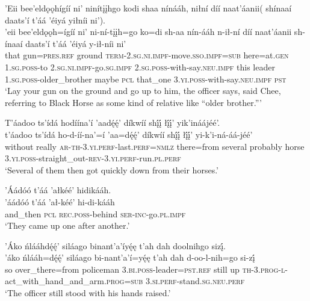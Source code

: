 \ea\label{ex:text1-66-18}
’Eii bee’eldǫǫhígíí ni’ ninítįįhgo kodi shaa nínááh, niłní díí naat’áanii( shínaaí daats’í t’áá ’éiyá yiłníi ni’).\\
\gll ’eii	bee’eldǫǫh=ígíí	ni’	ni-ní-tįįh=go	ko=di	sh-aa	nín-ááh	n-ił-ní	díí	naat’áanii	sh-ínaaí	daats’í	t’áá ’éiyá	y-ił-níi	ni’\\
     that	gun=\textsc{pres}.\textsc{ref}	ground	\textsc{term}-2.\textsc{sg}.\textsc{ni}.\textsc{impf}-move.\textsc{sso}.\textsc{impf}=\textsc{sub}	here=at.\textsc{gen}	1.\textsc{sg}.\textsc{poss}-to	2.\textsc{sg}.\textsc{ni}.\textsc{impf}-go.\textsc{sg}.\textsc{impf}	2.\textsc{sg}.\textsc{poss}-with-say.\textsc{neu}.\textsc{impf}	this	leader	1.\textsc{sg}.\textsc{poss}-older\_brother	maybe	\textsc{pcl} that\_one	3.\textsc{yi}.\textsc{poss}-with-say.\textsc{neu}.\textsc{impf}	\textsc{pst}\\
\glt `Lay your gun on the ground and go up to him, the officer says, said Chee, referring to Black Horse as some kind of relative like ``older brother.'''
\z

\ea\label{ex:text1-67-1}
T’áadoo ts’ídá hodíína’í ’aadę́ę́’ díkwíí shį́į́ łį́į́’ yik’ináájéé’.\\
\gll t’áadoo	ts’ídá	ho-d-íí-na’=í	’aa=dę́ę́’	díkwíí	shį́į́	łį́į́’	yi-k’i-ná-áá-jéé’\\
     without	really	\textsc{ar}-\textsc{th}-3.\textsc{yi}.\textsc{perf}-last.\textsc{perf}=\textsc{nmlz}	there=from	several	probably	horse	3.\textsc{yi}.\textsc{poss}-straight\_out-\textsc{rev}-3.\textsc{yi}.\textsc{perf}-run.\textsc{pl}.\textsc{perf}\\
\glt `Several of them then got quickly down from their horses.'
\z

\ea\label{ex:text1-67-2}
’Áádóó t’áá ’ałkéé’ hidikááh.\\
\gll ’áádóó	t’áá	’ał-kéé’	hi-di-kááh\\
     and\_then	\textsc{pcl}	\textsc{rec}.\textsc{poss}-behind	\textsc{ser}-\textsc{inc}-go.\textsc{pl}.\textsc{impf}\\
\glt `They came up one after another.'
\z

\ea\label{ex:text1-67-3}
’Áko ńlááhdę́ę́’ siláago binant’a’íyę́ę t’ah dah doolnihgo sizį́.\\
\gll ’áko	ńlááh=dę́ę́’	siláago	bi-nant’a’í=yę́ę	t’ah	dah	d-oo-l-nih=go	si-zį́\\
     so	over\_there=from	policeman	3.\textsc{bi}.\textsc{poss}-leader=\textsc{pst}.\textsc{ref}	still	up	\textsc{th}-3.\textsc{prog}-\textsc{l}-act\_with\_hand\_and\_arm.\textsc{prog}=\textsc{sub}	3.\textsc{si}.\textsc{perf}-stand.\textsc{sg}.\textsc{neu}.\textsc{perf}\\
\glt `The officer still stood with his hands raised.'
\z


